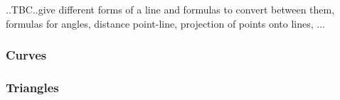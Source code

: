 

..TBC..give different forms of a line and formulas to convert between them, formulas for angles, distance point-line, projection of points onto lines, ...



%



\subsubsection{Curves}

\subsubsection{Triangles}


